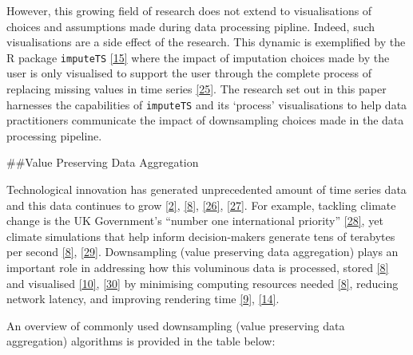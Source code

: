 \documentclass{article}
\begin{document}
However, this growing field of research does not extend to
visualisations of choices and assumptions made during data processing
pipline. Indeed, such visualisations are a side effect of the research.
This dynamic is exemplified by the R package \texttt{imputeTS}
\protect\hyperlink{ref-imputeTS_R}{{[}15{]}} where the impact of
imputation choices made by the user is only visualised to support the
user through the complete process of replacing missing values in time
series \protect\hyperlink{ref-imputeTS}{{[}25{]}}. The research set out
in this paper harnesses the capabilities of \texttt{imputeTS} and its
`process' visualisations to help data practitioners communicate the
impact of downsampling choices made in the data processing pipeline.

\#\#Value Preserving Data Aggregation

Technological innovation has generated unprecedented amount of time
series data and this data continues to grow
\protect\hyperlink{ref-data2020}{{[}2{]}},
\protect\hyperlink{ref-TVStore}{{[}8{]}},
\protect\hyperlink{ref-storage}{{[}26{]}},
\protect\hyperlink{ref-CatchUp}{{[}27{]}}. For example, tackling climate
change is the UK Government's ``number one international priority''
\protect\hyperlink{ref-IR}{{[}28{]}}, yet climate simulations that help
inform decision-makers generate tens of terabytes per second
\protect\hyperlink{ref-TVStore}{{[}8{]}},
\protect\hyperlink{ref-climate}{{[}29{]}}. Downsampling (value
preserving data aggregation) plays an important role in addressing how
this voluminous data is processed, stored
\protect\hyperlink{ref-TVStore}{{[}8{]}} and visualised
\protect\hyperlink{ref-Sveinn}{{[}10{]}},
\protect\hyperlink{ref-dashql}{{[}30{]}} by minimising computing
resources needed \protect\hyperlink{ref-TVStore}{{[}8{]}}, reducing
network latency, and improving rendering time
\protect\hyperlink{ref-datapoint}{{[}9{]}},
\protect\hyperlink{ref-MinMaxLTTB}{{[}14{]}}.

An overview of commonly used downsampling (value preserving data
aggregation) algorithms is provided in the table below:
\end{document}
